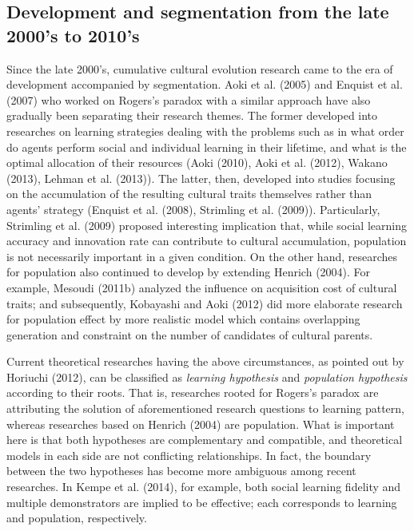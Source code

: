\documentclass[a4paper, dvipdfmx]{article}
\begin{document}
\subsection*{Development and segmentation from the late 2000's to 2010's}
Since the late 2000's, cumulative cultural evolution research came to the era of development accompanied by segmentation. Aoki et al. (2005) and Enquist et al. (2007) who worked on Rogers's paradox with a similar approach have also gradually been separating their research themes. The former developed into researches on learning strategies dealing with the problems such as in what order do agents perform social and individual learning in their lifetime, and what is the optimal allocation of their resources (Aoki (2010), Aoki et al. (2012), Wakano (2013), Lehman et al. (2013)). The latter, then, developed into studies focusing on the accumulation of the resulting cultural traits themselves rather than agents' strategy (Enquist et al. (2008), Strimling et al. (2009)). Particularly, Strimling et al. (2009) proposed interesting implication that, while social learning accuracy and innovation rate can contribute to cultural accumulation, population is not necessarily important in a given condition. On the other hand, researches for population also continued to develop by extending Henrich (2004). For example, Mesoudi (2011b) analyzed the influence on acquisition cost of cultural traits; and subsequently, Kobayashi and Aoki (2012) did more elaborate research for population effect by more realistic model which contains overlapping generation and constraint on the number of candidates of cultural parents.

Current theoretical researches having the above circumstances, as pointed out by Horiuchi (2012), can be classified as {\it learning hypothesis} and {\it population hypothesis} according to their roots. That is, researches rooted for Rogers's paradox are attributing the solution of aforementioned research questions to learning pattern, whereas researches based on Henrich (2004) are population. What is important here is that both hypotheses are complementary and compatible, and theoretical models in each side are not conflicting relationships. In fact, the boundary between the two hypotheses has become more ambiguous among recent researches. In Kempe et al. (2014), for example, both social learning fidelity and multiple demonstrators are implied to be effective; each corresponds to learning and population, respectively.
\end{document}
